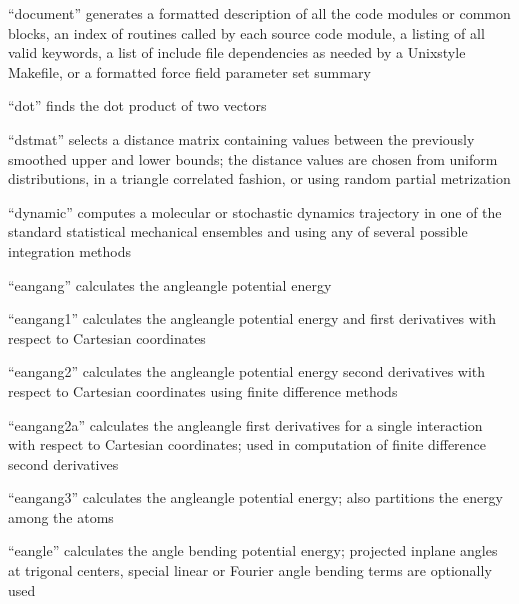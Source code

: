 \documentclass[letterpaper,11pt,english]{sphinxmanual}
\begin{document}

“document” generates a formatted description of all the code
modules or common blocks, an index of routines called by each
source code module, a listing of all valid keywords, a list of
include file dependencies as needed by a Unix\sphinxhyphen{}style Makefile,
or a formatted force field parameter set summary


“dot” finds the dot product of two vectors


“dstmat” selects a distance matrix containing values between
the previously smoothed upper and lower bounds; the distance
values are chosen from uniform distributions, in a triangle
correlated fashion, or using random partial metrization


“dynamic” computes a molecular or stochastic dynamics trajectory
in one of the standard statistical mechanical ensembles and using
any of several possible integration methods


“eangang” calculates the angle\sphinxhyphen{}angle potential energy


“eangang1” calculates the angle\sphinxhyphen{}angle potential energy and
first derivatives with respect to Cartesian coordinates


“eangang2” calculates the angle\sphinxhyphen{}angle potential energy
second derivatives with respect to Cartesian coordinates
using finite difference methods


“eangang2a” calculates the angle\sphinxhyphen{}angle first derivatives for
a single interaction with respect to Cartesian coordinates;
used in computation of finite difference second derivatives


“eangang3” calculates the angle\sphinxhyphen{}angle potential energy;
also partitions the energy among the atoms


“eangle” calculates the angle bending potential energy;
projected in\sphinxhyphen{}plane angles at trigonal centers, special
linear or Fourier angle bending terms are optionally used
\end{document}
